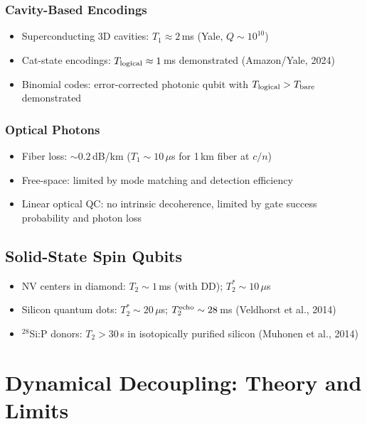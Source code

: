 \documentclass[11pt,letterpaper]{article}
\begin{document}
\subsubsection{Cavity-Based Encodings}

\begin{itemize}
\item Superconducting 3D cavities: $T_1 \approx 2$\,ms (Yale,
$Q \sim 10^{10}$)
\item Cat-state encodings: $T_{\rm logical} \approx 1$\,ms demonstrated
(Amazon/Yale, 2024)
\item Binomial codes: error-corrected photonic qubit with
$T_{\rm logical} > T_{\rm bare}$ demonstrated
\end{itemize}

\subsubsection{Optical Photons}
\begin{itemize}
\item Fiber loss: $\sim 0.2$\,dB/km ($T_1 \sim 10\,\mu$s for 1\,km
fiber at $c/n$)
\item Free-space: limited by mode matching and detection efficiency
\item Linear optical QC: no intrinsic decoherence, limited by gate
success probability and photon loss
\end{itemize}

\subsection{Solid-State Spin Qubits}

\begin{itemize}
\item NV centers in diamond: $T_2 \sim 1$\,ms (with DD); $T_2^* \sim
10\,\mu$s
\item Silicon quantum dots: $T_2^* \sim 20\,\mu$s; $T_2^{\rm echo}
\sim 28$\,ms (Veldhorst et al., 2014)
\item $^{28}$Si:P donors: $T_2 > 30$\,s in isotopically purified
silicon (Muhonen et al., 2014)
\end{itemize}

\section{Dynamical Decoupling: Theory and Limits}
\end{document}
